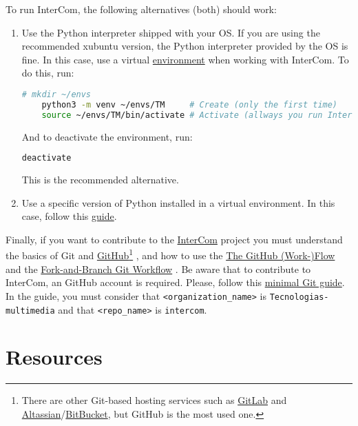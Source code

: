 To run InterCom, the following alternatives (both) should work:
\begin{enumerate}
\item Use the Python interpreter shipped with your OS. If you are
  using the recommended xubuntu version, the Python interpreter
  provided by the OS is fine. In this case, use a virtual
  \href{https://docs.python.org/3/library/venv.html}{environment} when
  working with InterCom. To do this, run:
  \begin{lstlisting}[language=Bash]
    # mkdir ~/envs
    python3 -m venv ~/envs/TM     # Create (only the first time)
    source ~/envs/TM/bin/activate # Activate (allways you run InterCom)
  \end{lstlisting}
  And to deactivate the environment, run:
  \begin{lstlisting}[language=Bash]
    deactivate
  \end{lstlisting}
  This is the recommended alternative.
  
\item Use a specific version of Python installed in a virtual environment. In this case, follow this 
\href{https://vicente-gonzalez-ruiz.github.io/Python_install/}{guide}.

\end{enumerate}

Finally, if you want to contribute to the
\href{https://github.com/Tecnologias-multimedia/intercom}{InterCom}
project \cite{intercom} you must understand the basics of Git
\cite{Git-book} and \href{https://github.com/}{GitHub}\footnote{There
are other Git-based hosting services such as
\href{https://about.gitlab.com/}{GitLab} and
\href{https://www.atlassian.com/git}{Altassian}/\href{https://bitbucket.org/product}{BitBucket},
but GitHub is the most used one.} \cite{GitHub}, and how to use the
\href{https://guides.github.com/introduction/flow/index.html}{The
  GitHub (Work-)Flow} and the
\href{https://github.com/vicente-gonzalez-ruiz/fork_and_branch_git_workflow}{Fork-and-Branch
  Git Workflow} \cite{fork-and-branch-git-workflow}. Be aware that to
contribute to InterCom, an GitHub account is required. Please, follow
this
\href{https://vicente-gonzalez-ruiz.github.io/using_GitHub/}{minimal
  Git guide}. In the guide, you must consider that
\texttt{<organization\_name>} is \texttt{Tecnologias-multimedia} and
that \texttt{<repo\_name>} is \texttt{intercom}.

\section{Resources}


